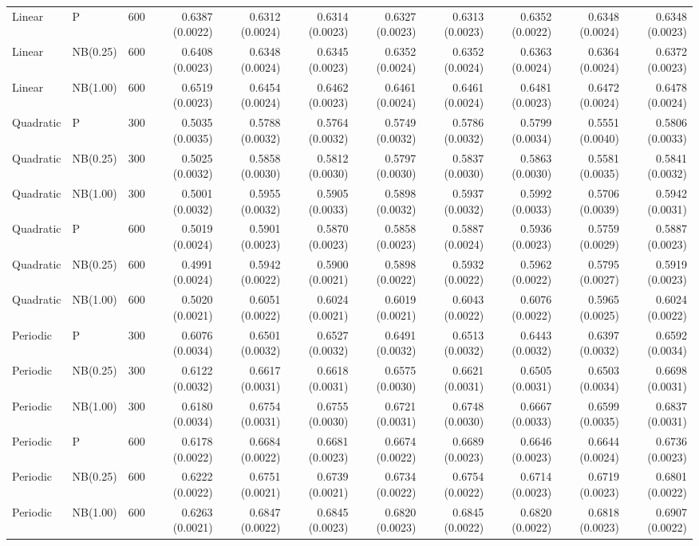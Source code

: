 \begin{table}[p]
{\begin{tabular}{lllrrrrrrrr}
Linear & P & 600 & 0.6387 (0.0022) & 0.6312 (0.0024) & 0.6314 (0.0023) & 0.6327 (0.0023) & 0.6313 (0.0023) & 0.6352 (0.0022) & 0.6348 (0.0024) & 0.6348 (0.0023) \\
Linear & NB(0.25) & 600 & 0.6408 (0.0023) & 0.6348 (0.0024) & 0.6345 (0.0023) & 0.6352 (0.0024) & 0.6352 (0.0024) & 0.6363 (0.0024) & 0.6364 (0.0024) & 0.6372 (0.0023) \\
Linear & NB(1.00) & 600 & 0.6519 (0.0023) & 0.6454 (0.0024) & 0.6462 (0.0023) & 0.6461 (0.0024) & 0.6461 (0.0024) & 0.6481 (0.0023) & 0.6472 (0.0024) & 0.6478 (0.0024) \\
\hline
Quadratic & P & 300 & 0.5035 (0.0035) & 0.5788 (0.0032) & 0.5764 (0.0032) & 0.5749 (0.0032) & 0.5786 (0.0032) & 0.5799 (0.0034) & 0.5551 (0.0040) & 0.5806 (0.0033) \\
Quadratic & NB(0.25) & 300 & 0.5025 (0.0032) & 0.5858 (0.0030) & 0.5812 (0.0030) & 0.5797 (0.0030) & 0.5837 (0.0030) & 0.5863 (0.0030) & 0.5581 (0.0035) & 0.5841 (0.0032) \\
Quadratic & NB(1.00) & 300 & 0.5001 (0.0032) & 0.5955 (0.0032) & 0.5905 (0.0033) & 0.5898 (0.0032) & 0.5937 (0.0032) & 0.5992 (0.0033) & 0.5706 (0.0039) & 0.5942 (0.0031) \\
Quadratic & P & 600 & 0.5019 (0.0024) & 0.5901 (0.0023) & 0.5870 (0.0023) & 0.5858 (0.0023) & 0.5887 (0.0024) & 0.5936 (0.0023) & 0.5759 (0.0029) & 0.5887 (0.0023) \\
Quadratic & NB(0.25) & 600 & 0.4991 (0.0024) & 0.5942 (0.0022) & 0.5900 (0.0021) & 0.5898 (0.0022) & 0.5932 (0.0022) & 0.5962 (0.0022) & 0.5795 (0.0027) & 0.5919 (0.0023) \\
Quadratic & NB(1.00) & 600 & 0.5020 (0.0021) & 0.6051 (0.0022) & 0.6024 (0.0021) & 0.6019 (0.0021) & 0.6043 (0.0022) & 0.6076 (0.0022) & 0.5965 (0.0025) & 0.6024 (0.0022) \\
\hline
Periodic & P & 300 & 0.6076 (0.0034) & 0.6501 (0.0032) & 0.6527 (0.0032) & 0.6491 (0.0032) & 0.6513 (0.0032) & 0.6443 (0.0032) & 0.6397 (0.0032) & 0.6592 (0.0034) \\
Periodic & NB(0.25) & 300 & 0.6122 (0.0032) & 0.6617 (0.0031) & 0.6618 (0.0031) & 0.6575 (0.0030) & 0.6621 (0.0031) & 0.6505 (0.0031) & 0.6503 (0.0034) & 0.6698 (0.0031) \\
Periodic & NB(1.00) & 300 & 0.6180 (0.0034) & 0.6754 (0.0031) & 0.6755 (0.0030) & 0.6721 (0.0031) & 0.6748 (0.0030) & 0.6667 (0.0033) & 0.6599 (0.0035) & 0.6837 (0.0031) \\
Periodic & P & 600 & 0.6178 (0.0022) & 0.6684 (0.0022) & 0.6681 (0.0023) & 0.6674 (0.0022) & 0.6689 (0.0023) & 0.6646 (0.0023) & 0.6644 (0.0024) & 0.6736 (0.0023) \\
Periodic & NB(0.25) & 600 & 0.6222 (0.0022) & 0.6751 (0.0021) & 0.6739 (0.0021) & 0.6734 (0.0022) & 0.6754 (0.0022) & 0.6714 (0.0023) & 0.6719 (0.0023) & 0.6801 (0.0022) \\
Periodic & NB(1.00) & 600 & 0.6263 (0.0021) & 0.6847 (0.0022) & 0.6845 (0.0023) & 0.6820 (0.0023) & 0.6845 (0.0022) & 0.6820 (0.0022) & 0.6818 (0.0023) & 0.6907 (0.0022) \\
\hline
\end{tabular}%
}
\end{table}
